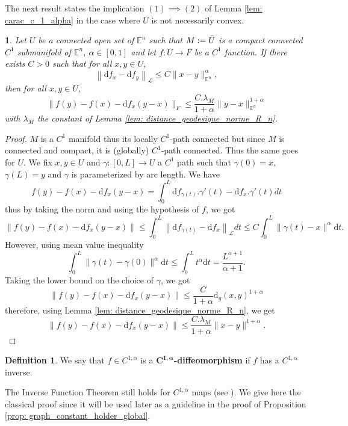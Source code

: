 \documentclass[11pt,reqno,a4paper]{article}%
\newtheorem{lemma}[theorem]{\sc{Lemma}}
\theoremstyle{definition}
\newtheorem{definition}{Definition}[section]
\theoremstyle{remark}
\renewcommand{\leq}{\leqslant}
\newcommand{\opnorm}[1]{{\left\| #1 \right\|}_{\mathcal{L}}}
\renewcommand{\d}{\mathrm{d}}
\newcommand{\E}{\mathbb{E}}
\renewcommand{\d}{\mathrm{d}}
\begin{document}

The next result states the implication $(1) \implies (2)$ of Lemma \ref{lem: carac_c_1_alpha} in the case where $U$ is not necessarily convex.

\begin{lemma} \label{lem: carac_c_1_alpha_2}
    Let $U $ be a connected open set of $\E^n$ such that $M := \Bar{U}$ is a compact connected $C^1$ submanifold of $\E^n$, $\alpha \in [0,1]$ and let $f : U \to F$ be a $C^{1}$ function. 
    If there exists $C > 0$ such that for all $x,y \in U$,
    \[\opnorm{ \d f_x - \d f_y} \leq C \|x -y\|_{\E^n}^\alpha,\]
    then for all $x,y \in U$,
    \[\| f(y) - f(x) - \d f_x(y-x)\|_F \leq \frac{C. \lambda_M}{1+\alpha} \|y-x\|_{\E^n}^{1 + \alpha}\]
    with $\lambda_M$ the constant of Lemma \ref{lem: distance_geodesique_norme_R_n}.
\end{lemma}

\begin{proof}
    $M$ is a $C^1$ manifold thus its locally $C^1$-path connected but since $M$ is connected and compact, it is (globally) $C^1$-path connected.
    Thus the same goes for $U$.
    We fix $x,y \in U$ and $\gamma : [0,L] \to U$ a $C^1$ path such that $\gamma(0) = x$, $\gamma(L) = y$ and $\gamma$ is parameterized by arc length.
    We have 
    \[ f(y) - f(x) - \d f_x(y-x) = \int_0^L \d f_{\gamma(t)}.\gamma'(t) - \d f_x.\gamma'(t) dt  \]
    thus by taking the norm and using the hypothesis of $f$, we got
    \[ \| f(y) - f(x) - \d f_x(y-x)\| \leq \int_0^L \opnorm{\d f_{\gamma(t)} - \d f_x} dt \leq C \int_0^L \|\gamma(t) - x\|^\alpha \d t.\]
    However, using mean value inequality 
    \[ \int_0^L \|\gamma(t) - \gamma(0)\|^\alpha \d t \leq \int_0^L t^\alpha \d t = \frac{L^{\alpha+1}}{\alpha + 1}. \]
    Taking the lower bound on the choice of $\gamma$, we got
    \[ \| f(y) - f(x) - \d f_x(y-x)\| \leq \frac{C}{1+\alpha} \d_{g}(x,y)^{1+\alpha}\]
    therefore, using Lemma \ref{lem: distance_geodesique_norme_R_n}, we get
    \[ \| f(y) - f(x) - \d f_x(y-x)\| \leq \frac{C. \lambda_M}{1+\alpha} \| x-y \|^{1+\alpha}.\]
\end{proof}


\begin{definition}
    We say that $f \in C^{1,\alpha}$ is a $\boldsymbol{C^{1,\alpha}}$\textbf{-diffeomorphism} if $f$ has a $C^{1,\alpha}$ inverse.
\end{definition}

\noindent The Inverse Function Theorem still holds for $C^{1,\alpha}$ maps (see \cite[pp 141]{ruelle1989elements}).
We give here the classical proof since it will be used later as a guideline in the proof of Proposition \ref{prop: graph_constant_holder_global}.
\end{document}
